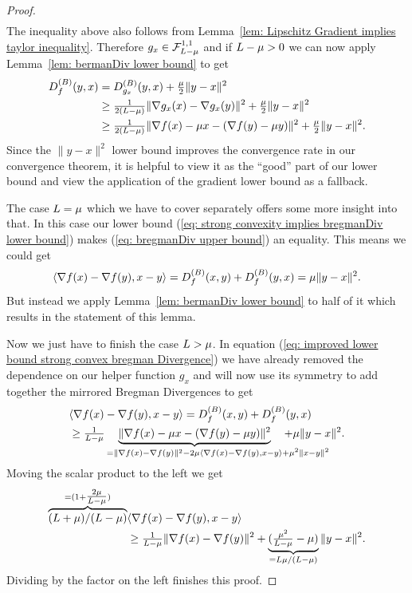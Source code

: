 \begin{proof}
\begin{align}
	\end{align}
	The inequality above also follows from Lemma~\ref{lem: Lipschitz Gradient
	implies taylor inequality}. Therefore
	\(g_x\in\mathcal{F}^{1,1}_{L-\mu}\) and if \(L -\mu>0\) we
	can now apply Lemma~\ref{lem: bermanDiv lower bound} to get
	\begin{align}
		D^{(B)}_{f}(y,x)
		&= D^{(B)}_{g_x}(y,x) + \tfrac{\mu}2 \|y-x\|^2
		\nonumber \\
		&\ge \tfrac{1}{2(L-\mu)} \|\nabla g_x(x) - \nabla g_x(y)\|^2
		+ \tfrac{\mu}2 \|y-x\|^2 
		\nonumber \\
		\label{eq: improved lower bound strong convex bregman Divergence}
		&\ge \tfrac{1}{2(L-\mu)}
		\|\nabla f(x) - \mu x - (\nabla f(y)-\mu y)\|^2
		+ \tfrac{\mu}2 \|y-x\|^2.
	\end{align}
	Since the \(\|y-x\|^2\) lower bound improves the convergence rate in
	our convergence theorem, it is helpful to view it as the ``good'' part of
	our lower bound and view the application of the gradient lower bound as
	a fallback.

	The case \(L=\mu\) which we have to cover separately offers some
	more insight into that. In this case our lower bound  (\ref{eq:
	strong convexity implies bregmanDiv lower bound}) makes (\ref{eq: bregmanDiv
	upper bound}) an equality. This means we could get
	\begin{align*}
		\langle \nabla f(x) - \nabla f(y), x-y\rangle
		= D^{(B)}_{f}(x,y) + D^{(B)}_{f}(y,x) = \mu \|y-x\|^2.
	\end{align*}
	But instead we apply Lemma~\ref{lem: bermanDiv lower bound} to half of it
	which results in the statement of this lemma.

	Now we just have to finish the case \(L>\mu\). In equation
	(\ref{eq: improved lower bound strong convex bregman Divergence}) we have
	already removed the dependence on our helper function \(g_x\) and will now
	use its symmetry to add together the mirrored Bregman Divergences to get
	\begin{align*}
		&\langle \nabla f(x) - \nabla f(y), x-y\rangle
		= \bregmanDiv{f}(x,y) + \bregmanDiv{f}(y,x) \\
		&\ge \tfrac{1}{\ubound-\lbound}
		\underbrace{\|\nabla f(x) - \lbound x - (\nabla f(y)-\lbound y)\|^2}_{
			=\|\nabla f(x) - \nabla f(y)\|^2
			- 2\lbound \langle \nabla f(x) - \nabla f(y), x-y\rangle
			\mathrlap{+ \lbound^2 \| x-y\|^2}
		}
		+ \lbound \|y-x\|^2.
	\end{align*}
	Moving the scalar product to the left we get
	\begin{align*}
		\overbrace{(L+\mu)/(L-\mu)}^{
			= (1+\tfrac{2\mu}{L-\mu})
		}
		&\langle \nabla f(x) - \nabla f(y), x-y\rangle \\
		&\ge \tfrac{1}{L-\mu}\|\nabla f(x) - \nabla f(y)\|^2
		+ \underbrace{(\tfrac{\mu^2}{L-\mu}-\mu)}_{
			=L\mu/(L-\mu)
		} \|y-x\|^2.
	\end{align*}
	Dividing by the factor on the left finishes this proof.
 \end{proof}

